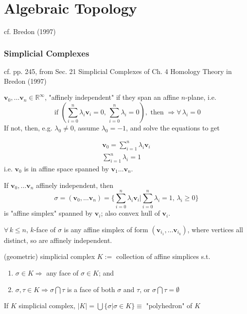 \part{Algebraic Topology}
  

cf. Bredon (1997) \cite{agat:Bred1997}


\section{Simplicial Complexes}  

cf. pp. 245, from Sec. 21 Simplicial Complexes of Ch. 4 Homology Theory in Bredon (1997) \cite{agat:Bred1997}

$\mathbf{v}_0, \dots \mathbf{v}_n \in \mathbb{R}^{\infty}$, "affinely independent" if they span an affine $n$-plane, i.e. 
\[
\text{ if } \left( \sum_{i=0}^n \lambda_i \mathbf{v}_i =0 , \, \sum_{i=0}^n \lambda_i = 0 \right), \text{ then } \Longrightarrow \forall \, \lambda_i = 0
\]
If not, then, e.g. $\lambda_0 \neq 0$, assume $\lambda_0 =-1$, and solve the equations to get 

\[
\begin{gathered}
\mathbf{v}_0 = \sum_{i=1}^n \lambda_i \mathbf{v}_i \\
\sum_{i=1}^n \lambda_i = 1
\end{gathered}
\]
i.e. $\mathbf{v}_0$ is in affine space spanned by $\mathbf{v}_1\dots \mathbf{v}_n$.  

If $\mathbf{v}_0, \dots \mathbf{v}_n$ affinely independent, then 
\begin{equation}
\sigma = ( \mathbf{v}_0, \dots \mathbf{v}_n) = \lbrace \sum_{i=0}^n \lambda_i \mathbf{v}_i | \sum_{i=0}^n \lambda_i = 1, \, \lambda_i \geq 0 \rbrace
\end{equation}
is "affine simplex" spanned by $\mathbf{v}_i$; also convex hull of $\mathbf{v}_i$.  

$\forall \, k \leq n$, $k$-face of $\sigma$ is any affine simplex of form $(\mathbf{v}_{i_1}, \dots \mathbf{v}_{i_k})$, where vertices all distinct, so are affinely independent.  

\begin{definition}
	(geometric) simplicial complex $K:= $ collection of affine simplices s.t. \begin{enumerate}
		\item $\sigma \in K \Longrightarrow $ any face of $\sigma \in K$; and 
		\item $\sigma, \tau \in K \Longrightarrow \sigma \bigcap \tau $ is a face of both $\sigma$ and $\tau$, or $\sigma \bigcap \tau =\emptyset$
	\end{enumerate}

If $K$ simplicial complex, $|K| = \bigcup \lbrace \sigma | \sigma \in K \rbrace \equiv $ "polyhedron" of $K$
\end{definition}

